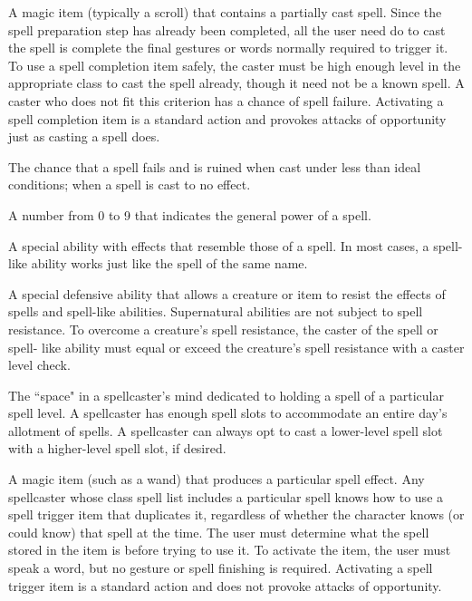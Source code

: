  A magic item (typically a scroll) that 
contains a partially cast spell. Since the spell preparation step has 
already been completed, all the user need do to cast the spell is 
complete the final gestures or words normally required to trigger it. 
To use a spell completion item safely, the caster must be high 
enough level in the appropriate class to cast the spell already, 
though it need not be a known spell. A caster who does not fit this 
criterion has a chance of spell failure. Activating a spell completion 
item is a standard action and provokes attacks of opportunity just as 
casting a spell does. 

 The chance that a spell fails and is ruined when cast 
under less than ideal conditions; when a spell is cast to no effect. 

 A number from 0 to 9 that indicates the general 
power of a spell. 

 A special ability with effects that resemble 
those of a spell. In most cases, a spell-like ability works just like the 
spell of the same name. 

 A special defensive ability that allows a 
creature or item to resist the effects of spells and spell-like abilities. 
Supernatural abilities are not subject to spell resistance. To 
overcome a creature's spell resistance, the caster of the spell or spell-
like ability must equal or exceed the creature's spell resistance with a 
caster level check. 

 The ``space" in a spellcaster's mind dedicated to holding a spell of a particular spell level. A spellcaster has enough spell 
slots to accommodate an entire day's allotment of spells. A spellcaster can always opt 
to cast a lower-level spell slot with a higher-level spell slot, if desired.

 A magic item (such as a wand) that produces a 
particular spell effect. Any spellcaster whose class spell list includes 
a particular spell knows how to use a spell trigger item that 
duplicates it, regardless of whether the character knows (or could 
know) that spell at the time. The user must determine what the spell 
stored in the item is before trying to use it. To activate the item, the 
user must speak a word, but no gesture or spell finishing is required. 
Activating a spell trigger item is a standard action and does not 
provoke attacks of opportunity. 

